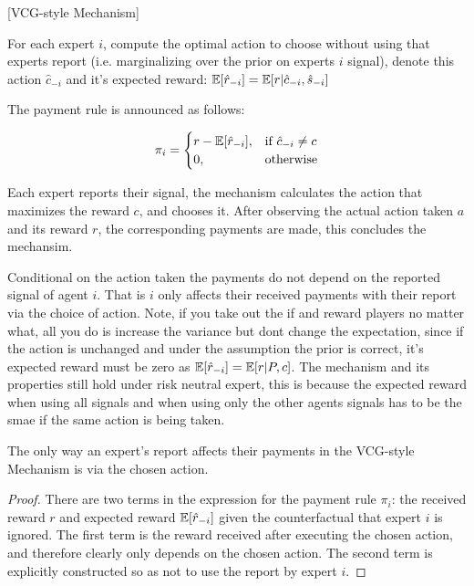 \begin{mech}\label{mech:vcg-style}[VCG-style Mechanism]



For each expert $i$, compute the optimal action to choose without using that experts report (i.e. marginalizing over the prior on experts $i$ signal), denote this action $\hat{c}_{-i}$ and it's expected reward: $\operatorname*{\mathbb E}[\hat{r}_{-i}] = \operatorname*{\mathbb E}[ r| \hat{c}_{-i}, \hat{s}_{-i}] $


The payment rule is announced as follows:

\[
    \pi_i = 
\begin{cases}
    r - \expec[\hat{r}_{-i}] ,& \text{if } \hat{c}_{-i} \neq c\\
    0,              & \text{otherwise}
\end{cases}
\]

%

Each expert reports their signal, the mechanism calculates the action that maximizes the reward $c$, and chooses it. After observing the actual action taken $a$ and its reward $r$, the corresponding payments are made, this concludes the mechansim.

\end{mech}


Conditional on the action taken the payments do not depend on the reported signal of agent $i$. That is $i$ only affects their received payments with their report via the choice of action. 
Note, if you take out the if and reward players no matter what, all you do is increase the variance but dont change the expectation, since if the action is unchanged and under the assumption the prior is correct, it's expected reward must be zero as $\operatorname*{\mathbb E}[\hat{r}_{-i}] = \operatorname*{\mathbb E}[r|P,c]$. The  mechanism and its properties still hold under risk neutral expert,  this is because the expected reward when using all signals and when using only the other agents signals has to be the smae if the same action is being taken. 


\begin{lem}\label{lem:affect}
	The only way an expert's report affects their payments in the VCG-style Mechanism is via the chosen action.
\end{lem}

\begin{proof}
There are two terms in the expression for the payment rule $\pi_i$: the received reward $r$ and expected reward $\operatorname*{\mathbb E}[\hat{r}_{-i}]$ given the counterfactual that expert $i$ is ignored. 
The first term is the reward received after executing the chosen action, and therefore clearly only depends on the chosen action. 
The second term is explicitly constructed so as not to use the report by expert $i$. 
\end{proof}


